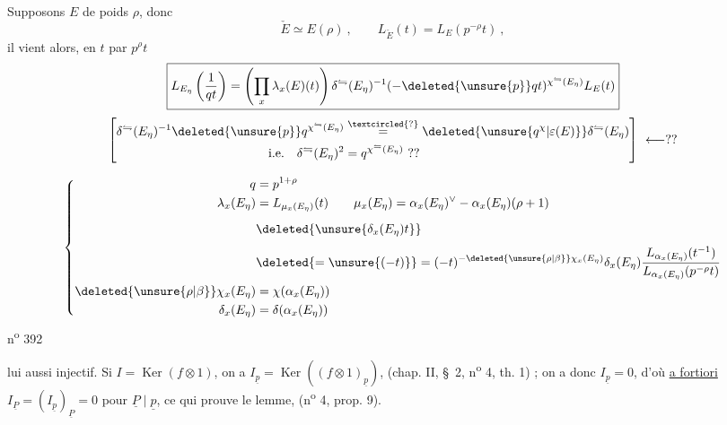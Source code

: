 Supposons $E$ de poids $\rho$, donc
\[
\check E\simeq E(\rho)\ ,\qquad L_{\check E}(t)=L_E(p^{-\rho}t)\ ,
\]
il vient alors, en  $t$ par $p^\rho t$
\[
\boxed{L_{E_\eta}\left(\frac1{qt}\right)=\left(\prod_x\lambda_x(E)(t)\right)\delta^{\leftrightharpoons}(E_\eta)^{-1}(-\deleted{\unsure{p}}qt)^{\chi^{\leftrightharpoons}(E_\eta)}L_E(t)}
\]
\[
\left[\begin{aligned}
\delta^{\leftrightharpoons}(E_\eta)^{-1}\deleted{\unsure{p}}q^{\chi^{\leftrightharpoons}(E_\eta)}
&\overset{\textcircled{?}}{=}\deleted{\unsure{q^{\chi}|\varepsilon(E)}}\delta^{\leftrightharpoons}(E_\eta)\\
\text{i.e.}\quad \delta^{\leftrightharpoons}(E_\eta)^2&=q^{\chi^{\leftrightharpoons}(E_\eta)}\ ??
\end{aligned}\right]\ \longleftarrow ??
\]

\[
\left\{\begin{aligned}
q&=p^{1+\rho}\\
\lambda_x(E_\eta)&=L_{\mu_x(E_\eta)}(t)\qquad
\mu_x(E_\eta)=\alpha_x(E_\eta)^\vee-\alpha_x(E_\eta)(\rho+1)\\
&\deleted{\unsure{\delta_x(E_\eta)t}}\vphantom{\frac11}\\
&\deleted{=\unsure{(-t)}}=(-t)^{-\deleted{\unsure{\rho|\beta}}\chi_x(E_\eta)}\delta_x(E_\eta)\frac{L_{\alpha_x(E_\eta)}(t^{-1})}{L_{\alpha_x(E_\eta)}(p^{-\rho}t)}\\
\deleted{\unsure{\rho|\beta}}\chi_x(E_\eta)&=\chi(\alpha_x(E_\eta))\\
\delta_x(E_\eta)&=\delta(\alpha_x(E_\eta))
\end{aligned}\right.
\]
n\textsuperscript{o} 392

lui aussi injectif. Si $I=\operatorname{Ker}(f\otimes 1)$, on a $I_{\underline p}=\operatorname{Ker}((f\otimes 1)_{\underline p})$, (chap. II, \S~2, n\textsuperscript{o} 4, th. 1) ; on a donc $I_{\underline p}=0$, d'où \uline{a fortiori} $I_{\underline P}=(I_{\underline p})_{\underline P}=0$ pour $\underline P\mid\underline p$, ce qui prouve le lemme, (n\textsuperscript{o} 4, prop. 9).

